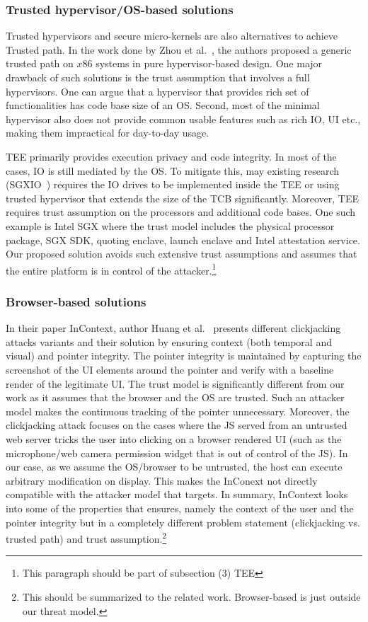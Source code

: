 \subsubsection{Trusted hypervisor/OS-based solutions} Trusted hypervisors and secure micro-kernels are also alternatives to achieve Trusted path. In the work done by Zhou et al.~\cite{zhou2012building}, the authors proposed a generic trusted path on $x86$ systems in pure hypervisor-based design. One major drawback of such solutions is the trust assumption that involves a full hypervisors. One can argue that a hypervisor that provides rich set of functionalities has code base size of an OS. Second, most of the minimal hypervisor also does not provide common usable features such as rich IO, UI etc., making them impractical for day-to-day usage. 

TEE primarily provides execution privacy and code integrity. In most of the cases, IO is still mediated by the OS. To mitigate this, may existing research (SGXIO~\cite{weiser2017sgxio}) requires the IO drives to be implemented inside the TEE or using trusted hypervisor that extends the size of the TCB significantly. Moreover, TEE requires trust assumption on the processors and additional code bases. One such example is Intel SGX where the trust model includes the physical processor package, SGX SDK, quoting enclave, launch enclave and Intel attestation service. Our proposed solution avoids such extensive trust assumptions and assumes that the entire platform is in control of the attacker.\footnote{This paragraph should be part of subsection (3) TEE}

\subsubsection{Browser-based solutions} In their paper InContext, author Huang et al.~\cite{huang2012clickjacking} presents different clickjacking attacks variants and their solution by ensuring context (both temporal and visual) and pointer integrity. The pointer integrity is maintained by capturing the screenshot of the UI elements around the pointer and verify with a baseline render of the legitimate UI. The trust model is significantly different from our work as it assumes that the browser and the OS are trusted. Such an attacker model makes the continuous tracking of the pointer unnecessary. Moreover, the clickjacking attack focuses on the cases where the JS served from an untrusted web server tricks the user into clicking on a browser rendered UI (such as the microphone/web camera permission widget that is out of control of the JS). In our case, as we assume the OS/browser to be untrusted, the host can execute arbitrary modification on display. This makes the InConext not directly compatible with the attacker model that \name targets. In summary, InContext looks into some of the properties that \name ensures, namely the context of the user and the pointer integrity but in a completely different problem statement (clickjacking vs. trusted path) and trust assumption.\footnote{This should be summarized to the related work. Browser-based is just outside our threat model.}

